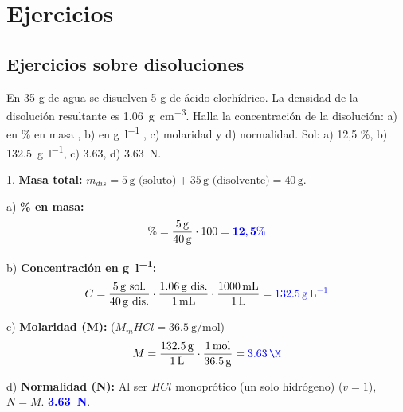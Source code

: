 
\section{Ejercicios}

\subsection{Ejercicios sobre disoluciones}

\begin{exercise}
    En 35 g de agua se disuelven 5 g de ácido clorhídrico. La densidad de la disolución resultante es \qty{1.06}{\g\per\cubic\centi\metre}. Halla la concentración de la disolución: a) en \% en masa , b) en \unit{\g\per\litre} , c) molaridad y d) normalidad.
    Sol: a) 12,5 \%,  b) \qty{132.5}{\g\per\litre},  c) \qty{3.63}{\M},  d) \qty{3.63}{\N}.

    \begin{solu}
        1. \textbf{Masa total:} $m_{dis} = 5\,\text{g (soluto)} + 35\,\text{g (disolvente)} = 40\,\text{g}$.

        a) \textbf{\% en masa:}
        \[ \% = \dfrac{\qty{5}{\g}}{\qty{40}{\g}} \cdot 100 = \mathbf{\textcolor{blue}{12,5 \%}} \]

        b) \textbf{Concentración en \unit{\g\per\litre}:}
        \[ C = \dfrac{\qty{5}{\g} \text{ sol.}}{\qty{40}{\g} \text{ dis.}} \cdot \dfrac{\qty{1.06}{\g} \text{ dis.}}{\qty{1}{\mL}} \cdot \dfrac{\qty{1000}{\mL}}{\qty{1}{\L}} = \mathbf{\textcolor{blue}{\qty{132.5}{\g\per\L}}} \]

        c) \textbf{Molaridad (M):} ($M_m HCl = \qty{36.5}{\g\per\mol}$)
        \[ M = \dfrac{\qty{132.5}{\g}}{\qty{1}{\L}} \cdot \dfrac{\qty{1}{\mol}}{\qty{36.5}{\g}} = \mathbf{\textcolor{blue}{\qty{3.63}{\M}}} \]

        d) \textbf{Normalidad (N):} Al ser $HCl$ monoprótico (un solo hidrógeno) ($v=1$), $N = M$. \textbf{\textcolor{blue}{\qty{3.63}{\N}}}.
    \end{solu}

\end{exercise}


